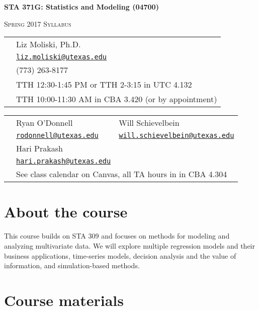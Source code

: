 \documentclass[12pt]{article}
\begin{document}
\pagestyle{fancy}
\thispagestyle{empty}


\begin{center}
\textbf{\Large STA 371G: Statistics and Modeling (04700)}


\textsc{\large Spring 2017 Syllabus}


\bigskip


\begin{tabular}{rl}
\noindent {\bf Instructor:} & Liz Moliski, Ph.D. \\
\noindent {\bf Email:} & \href{mailto:liz.moliski@utexas.edu}{\tt liz.moliski@utexas.edu} \\
\noindent {\bf Phone:} & (773) 263-8177 \\
\noindent {\bf Class Meetings:} & TTH 12:30-1:45 PM or TTH 2-3:15 in UTC 4.132 \\
\noindent {\bf Office Hours:} & TTH 10:00-11:30 AM in CBA 3.420 (or by appointment)\\
\end{tabular}


\begin{tabular}{rll}
\noindent {\bf TA:} & Ryan O'Donnell & Will Schievelbein \\
\noindent {\bf Email:} & \href{mailto:rodonnell@utexas.edu}{\tt rodonnell@utexas.edu} & \href{mailto:will.schievelbein@utexas.edu}{\tt  will.schievelbein@utexas.edu} \\
\noindent {\bf TA:} & Hari Prakash \\
\noindent {\bf Email:} & \href{mailto:hari.prakash@utexas.edu}{\tt hari.prakash@utexas.edu} \\
\noindent {\bf TA Office Hours:} & \multicolumn{2}{l}{See class calendar on Canvas, all TA hours in in CBA 4.304}  \\
\end{tabular}


\end{center}


\section*{About the course}


This course builds on STA 309 and focuses on methods for modeling and analyzing multivariate data.  We will explore multiple regression models and their business applications, time-series models, decision analysis and the value of information, and simulation-based methods.


\section*{Course materials}
\end{document}
